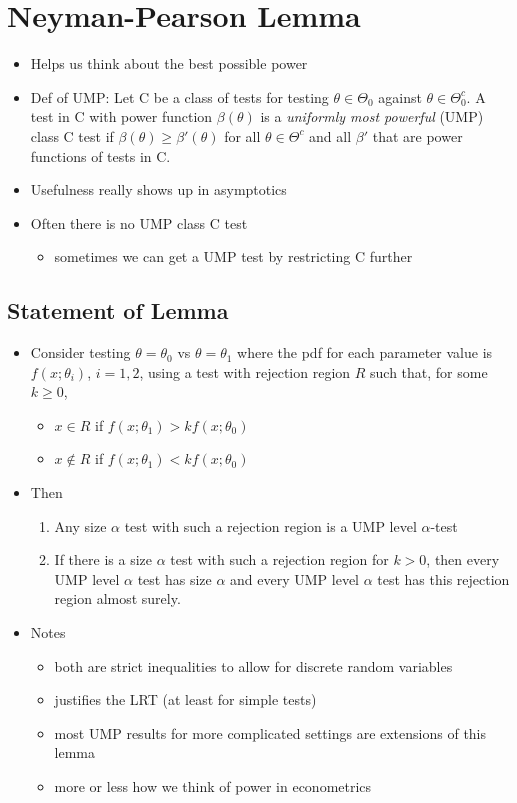 \section{Neyman-Pearson Lemma}

\begin{itemize}
\item Helps us think about the best possible power
\item Def of UMP: Let C be a class of tests for testing $\theta \in \Theta_0$
  against $\theta \in \Theta_0^c$.  A test in C with power function $\beta(\theta)$ is a
  \emph{uniformly most powerful} (UMP) class C test if $\beta(\theta) \geq \beta'(\theta)$
  for all $\theta \in \Theta^c$ and all $\beta'$ that are power functions of tests in
  C.
\item Usefulness really shows up in asymptotics
\item Often there is no UMP class C test
\begin{itemize}
\item sometimes we can get a UMP test by restricting C further
\end{itemize}
\end{itemize}

\subsection{Statement of Lemma}

\begin{itemize}
\item Consider testing $\theta = \theta_0$ vs $\theta = \theta_1$ where the pdf for each
  parameter value is $f(x; \theta_i)$, $i = 1,2$, using a test with
  rejection region $R$ such that, for some $k \geq 0$,
\begin{itemize}
\item $x \in R$ if $f(x; \theta_1) > k f(x; \theta_0)$
\item $x \notin R$ if $f(x; \theta_1) < k f(x; \theta_0)$
\end{itemize}
\item Then
\begin{enumerate}
\item Any size $\alpha$ test with such a rejection region is a UMP level $\alpha$-test
\item If there is a size $\alpha$ test with such a rejection region for $k
  > 0$, then every UMP level $\alpha$ test has size $\alpha$ and every UMP level
  $\alpha$ test has this rejection region almost surely.
\end{enumerate}
\item Notes
\begin{itemize}
\item both are strict inequalities to allow for discrete random
         variables
\item justifies the LRT (at least for simple tests)
\item most UMP results for more complicated settings are extensions
         of this lemma
\item more or less how we think of power in econometrics
\end{itemize}
\end{itemize}


